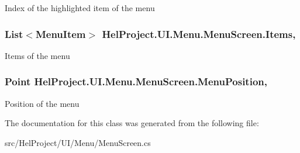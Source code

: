 Index of the highlighted item of the menu 

\hypertarget{class_hel_project_1_1_u_i_1_1_menu_1_1_menu_screen_a5c4e68d9b5187dde747e872b719d2886}{}
\subsubsection[{Items}]{\setlength{\rightskip}{0pt plus 5cm}List$<${\bf Menu\+Item}$>$ Hel\+Project.\+U\+I.\+Menu.\+Menu\+Screen.\+Items\hspace{0.3cm}{\ttfamily [get]}, {\ttfamily [set]}}\label{class_hel_project_1_1_u_i_1_1_menu_1_1_menu_screen_a5c4e68d9b5187dde747e872b719d2886}


Items of the menu 

\hypertarget{class_hel_project_1_1_u_i_1_1_menu_1_1_menu_screen_a0bd573fd87cbe653e0c8b50fe309de3a}{}
\subsubsection[{Menu\+Position}]{\setlength{\rightskip}{0pt plus 5cm}Point Hel\+Project.\+U\+I.\+Menu.\+Menu\+Screen.\+Menu\+Position\hspace{0.3cm}{\ttfamily [get]}, {\ttfamily [set]}}\label{class_hel_project_1_1_u_i_1_1_menu_1_1_menu_screen_a0bd573fd87cbe653e0c8b50fe309de3a}


Position of the menu 



The documentation for this class was generated from the following file\+:\begin{DoxyCompactItemize}
\item 
src/\+Hel\+Project/\+U\+I/\+Menu/Menu\+Screen.\+cs\end{DoxyCompactItemize}
